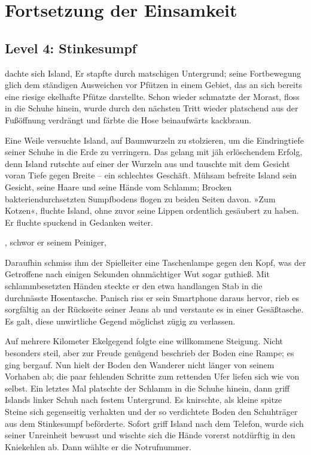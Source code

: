 \chapter{Fortsetzung der Einsamkeit}

\section{Level 4: Stinkesumpf}

 dachte sich Island,  Er stapfte durch matschigen Untergrund; seine Fortbewegung glich dem ständigen Ausweichen vor Pfützen in einem Gebiet, das an sich bereits eine riesige ekelhafte Pfütze darstellte. Schon wieder schmatzte der Morast, floss in die Schuhe hinein, wurde durch den nächsten Tritt wieder platschend aus der Fußöffnung verdrängt und färbte die Hose beinaufwärts kackbraun.

Eine Weile versuchte Island, auf Baumwurzeln zu stolzieren, um die Eindringtiefe seiner Schuhe in die Erde zu verringern. Das gelang mit jäh erlöschendem Erfolg, denn Island rutschte auf einer der Wurzeln aus und tauschte mit dem Gesicht voran Tiefe gegen Breite – ein schlechtes Geschäft. Mühsam befreite Island sein Gesicht, seine Haare und seine Hände vom Schlamm; Brocken bakteriendurchsetzten Sumpfbodens flogen zu beiden Seiten davon. »Zum Kotzen«, fluchte Island, ohne zuvor seine Lippen ordentlich gesäubert zu haben. Er fluchte spuckend in Gedanken weiter.

, schwor er seinem Peiniger, 

Daraufhin schmiss ihm der Spielleiter eine Taschenlampe gegen den Kopf, was der Getroffene nach einigen Sekunden ohnmächtiger Wut sogar guthieß. Mit schlammbesetzten Händen steckte er den etwa handlangen Stab in die durchnässte Hosentasche. Panisch riss er sein Smartphone daraus hervor, rieb es sorgfältig an der Rückseite seiner Jeans ab und verstaute es in einer Gesäßtasche. Es galt, diese unwirtliche Gegend möglichst zügig zu verlassen.

Auf mehrere Kilometer Ekelgegend folgte eine willkommene Steigung. Nicht besonders steil, aber zur Freude genügend beschrieb der Boden eine Rampe; es ging bergauf. Nun hielt der Boden den Wanderer nicht länger von seinem Vorhaben ab; die paar fehlenden Schritte zum rettenden Ufer liefen sich wie von selbst. Ein letztes Mal platschte der Schlamm in die Schuhe hinein, dann griff Islands linker Schuh nach festem Untergrund. Es knirschte, als kleine spitze Steine sich gegenseitig verhakten und der so verdichtete Boden den Schuhträger aus dem Stinkesumpf beförderte. Sofort griff Island nach dem Telefon, wurde sich seiner Unreinheit bewusst und wischte sich die Hände vorerst notdürftig in den Kniekehlen ab. Dann wählte er die Notrufnummer.

